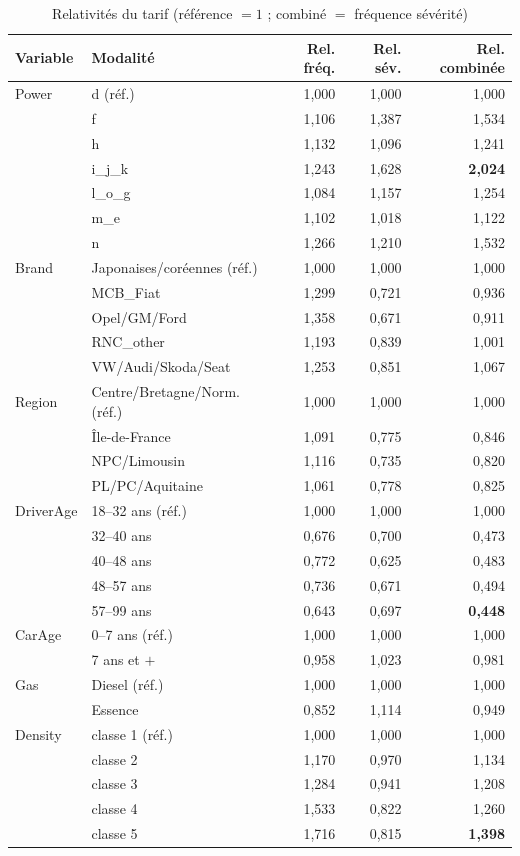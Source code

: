 \documentclass[11pt,a4paper]{article}
\begin{document}
\begin{table}[H]
\centering
\caption{Relativités du tarif (référence $=1$ ; combiné $=$ fréquence \texttimes{} sévérité)}
\small
\begin{tabular}{llrrr}
\toprule
Variable & Modalité & Rel. fréq. & Rel. sév. & Rel. combinée \\
\midrule
Power & d (réf.) & 1{,}000 & 1{,}000 & 1{,}000 \\
 & f & 1{,}106 & 1{,}387 & 1{,}534 \\
 & h & 1{,}132 & 1{,}096 & 1{,}241 \\
 & i\_j\_k & 1{,}243 & 1{,}628 & \textbf{2{,}024} \\
 & l\_o\_g & 1{,}084 & 1{,}157 & 1{,}254 \\
 & m\_e & 1{,}102 & 1{,}018 & 1{,}122 \\
 & n & 1{,}266 & 1{,}210 & 1{,}532 \\
\midrule
Brand & Japonaises/coréennes (réf.) & 1{,}000 & 1{,}000 & 1{,}000 \\
 & MCB\_Fiat & 1{,}299 & 0{,}721 & 0{,}936 \\
 & Opel/GM/Ford & 1{,}358 & 0{,}671 & 0{,}911 \\
 & RNC\_other & 1{,}193 & 0{,}839 & 1{,}001 \\
 & VW/Audi/Skoda/Seat & 1{,}253 & 0{,}851 & 1{,}067 \\
\midrule
Region & Centre/Bretagne/Norm. (réf.) & 1{,}000 & 1{,}000 & 1{,}000 \\
 & Île-de-France & 1{,}091 & 0{,}775 & 0{,}846 \\
 & NPC/Limousin & 1{,}116 & 0{,}735 & 0{,}820 \\
 & PL/PC/Aquitaine & 1{,}061 & 0{,}778 & 0{,}825 \\
\midrule
DriverAge & 18--32 ans (réf.) & 1{,}000 & 1{,}000 & 1{,}000 \\
 & 32--40 ans & 0{,}676 & 0{,}700 & 0{,}473 \\
 & 40--48 ans & 0{,}772 & 0{,}625 & 0{,}483 \\
 & 48--57 ans & 0{,}736 & 0{,}671 & 0{,}494 \\
 & 57--99 ans & 0{,}643 & 0{,}697 & \textbf{0{,}448} \\
\midrule
CarAge & 0--7 ans (réf.) & 1{,}000 & 1{,}000 & 1{,}000 \\
 & 7 ans et $+$ & 0{,}958 & 1{,}023 & 0{,}981 \\
\midrule
Gas & Diesel (réf.) & 1{,}000 & 1{,}000 & 1{,}000 \\
 & Essence & 0{,}852 & 1{,}114 & 0{,}949 \\
\midrule
Density & classe 1 (réf.) & 1{,}000 & 1{,}000 & 1{,}000 \\
 & classe 2 & 1{,}170 & 0{,}970 & 1{,}134 \\
 & classe 3 & 1{,}284 & 0{,}941 & 1{,}208 \\
 & classe 4 & 1{,}533 & 0{,}822 & 1{,}260 \\
 & classe 5 & 1{,}716 & 0{,}815 & \textbf{1{,}398} \\
\bottomrule
\end{tabular}
\label{tab:relativites}
\end{table}
\end{document}
